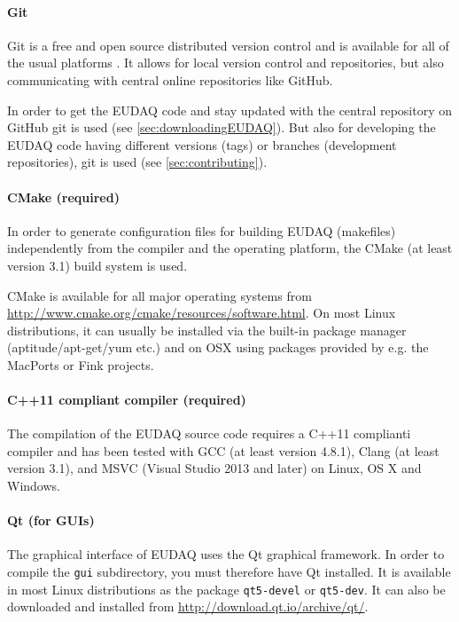 \paragraph{Git}
Git is a free and open source distributed version control and is available for all of the usual platforms \cite{gitWWW}. 
It allows for local version control and repositories, but also communicating with central online repositories like GitHub.
   
In order to get the EUDAQ code and stay updated with the central repository on GitHub git is used (see \autoref{sec:downloadingEUDAQ}).
But also for developing the EUDAQ code having different versions (tags) or branches (development repositories), git is used (see \autoref{sec:contributing}).


\paragraph{CMake (required)}
In order to generate configuration files for building EUDAQ (makefiles) independently from the compiler and the operating platform, the CMake (at least version 3.1) build system is used.

CMake is available for all major operating systems from \url{http://www.cmake.org/cmake/resources/software.html}. 
On most Linux distributions, it can usually be installed via the built-in package manager (aptitude/apt-get/yum etc.) and on OSX using packages provided by e.g. the MacPorts or Fink projects.

\paragraph{C++11 compliant compiler (required)}
The compilation of the EUDAQ source code requires a C++11 complianti compiler and has been tested with GCC (at least version 4.8.1), Clang (at least version 3.1), and MSVC (Visual Studio 2013 and later) on Linux, OS X and Windows.

\paragraph{Qt (for GUIs)}
The graphical interface of EUDAQ uses the Qt graphical framework.
In order to compile the \texttt{gui} subdirectory, you must therefore have Qt installed.
It is available in most Linux distributions as the package \texttt{qt5-devel} or \texttt{qt5-dev}.
It can also be downloaded and installed from \url{http://download.qt.io/archive/qt/}. 

